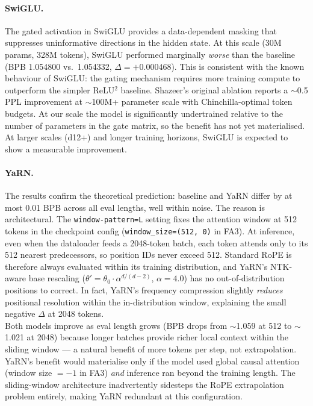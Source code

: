 \documentclass[a4paper,12pt]{article}
\begin{document}
\paragraph{SwiGLU.}
\noindent The gated activation in SwiGLU provides a data-dependent masking that suppresses
uninformative directions in the hidden state.  At this scale (30M params,
328M tokens), SwiGLU performed marginally \emph{worse} than the baseline
(BPB 1.054800 vs.\ 1.054332, $\Delta = +0.000468$).  This is consistent with
the known behaviour of SwiGLU: the gating mechanism requires more training
compute to outperform the simpler ReLU$^2$ baseline.  Shazeer's original
ablation \cite{shazeer2020glu} reports a $\sim$0.5 PPL improvement at
$\sim$100M+ parameter scale with Chinchilla-optimal token budgets.
At our scale the model is significantly undertrained relative to the
number of parameters in the gate matrix, so the benefit has not yet materialised.
At larger scales (d12+) and longer training horizons, SwiGLU is expected to
show a measurable improvement.

\paragraph{YaRN.}
\noindent The results confirm the theoretical prediction: baseline and YaRN differ by
at most 0.01 BPB across all eval lengths, well within noise.  The reason is
architectural.  The \texttt{window-pattern=L} setting fixes the attention
window at 512 tokens in the checkpoint config (\texttt{window\_size=(512,~0)}
in FA3).  At inference, even when the dataloader feeds a 2048-token batch,
each token attends only to its 512 nearest predecessors, so position IDs
never exceed 512.  Standard RoPE is therefore always evaluated within its
training distribution, and YaRN's NTK-aware base rescaling
($\theta' = \theta_0 \cdot \alpha^{d/(d-2)}$, $\alpha=4.0$) has no
out-of-distribution positions to correct.  In fact, YaRN's frequency
compression slightly \emph{reduces} positional resolution within the
in-distribution window, explaining the small negative $\Delta$ at 2048 tokens. \\

Both models improve as eval length grows (BPB drops from $\sim$1.059 at 512
to $\sim$1.021 at 2048) because longer batches provide richer local context
within the sliding window — a natural benefit of more tokens per step, not
extrapolation. \\

YaRN's benefit would materialise only if the model used global causal
attention (window size $= -1$ in FA3) \emph{and} inference ran beyond the
training length.  The sliding-window architecture inadvertently sidesteps
the RoPE extrapolation problem entirely, making YaRN redundant at this
configuration.
\end{document}
